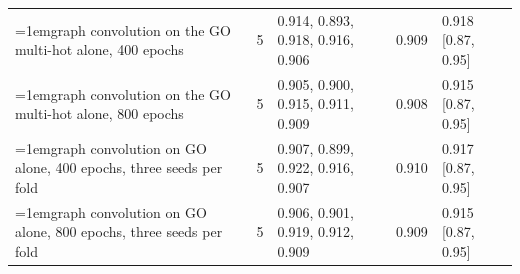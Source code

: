 \begin{table}[H]
\begin{tabular}{@{}>{\raggedright\hangindent=1em\hangafter=1\arraybackslash}p{88.6mm}rlrl@{}}
    graph convolution on the GO multi-hot alone, 400 epochs & 5 & 0.914, 0.893, 0.918, 0.916, 0.906 & 0.909 & 0.918 [0.87, 0.95] \\
    graph convolution on the GO multi-hot alone, 800 epochs & 5 & 0.905, 0.900, 0.915, 0.911, 0.909 & 0.908 & 0.915 [0.87, 0.95] \\
    graph convolution on GO alone, 400 epochs, three seeds per fold & 5 & 0.907, 0.899, 0.922, 0.916, 0.907 & 0.910 & 0.917 [0.87, 0.95] \\
    graph convolution on GO alone, 800 epochs, three seeds per fold & 5 & 0.906, 0.901, 0.919, 0.912, 0.909 & 0.909 & 0.915 [0.87, 0.95] \\
    \hline
  \end{tabular}
\end{table}
